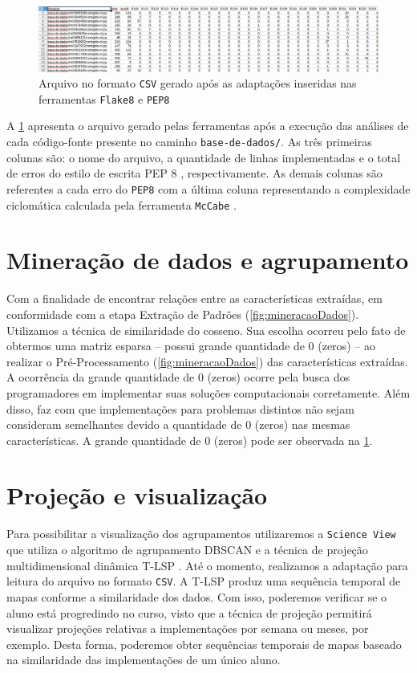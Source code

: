 		\begin{figure}[h]
			\centering
			\includegraphics[width=1\linewidth]{imagem/arquivoCSV}
			\caption{Arquivo no formato \texttt{CSV} gerado após as adaptações inseridas nas ferramentas \texttt{Flake8} e \texttt{PEP8}}
			\label{fig:arquivoCSV}
		\end{figure}
		
		A \cref{fig:arquivoCSV} apresenta o arquivo gerado pelas ferramentas após a
		execução das análises de cada código-fonte presente no caminho \texttt{base-de-dados/}.
		As três primeiras colunas são: o nome do arquivo, a quantidade de linhas implementadas
		e o total de erros do estilo de escrita PEP 8 \cite{van2001pep}, respectivamente. As
		demais colunas são referentes a cada erro do \texttt{PEP8} \cite{pep8} com a última
		coluna representando a complexidade ciclomática calculada pela ferramenta
		\texttt{McCabe} \cite{mccabe}.

	\section{Mineração de dados e agrupamento}
		Com a finalidade de encontrar relações entre as características extraídas, em
		conformidade com a etapa Extração de Padrões (\cref{fig:mineracaoDados}).
		Utilizamos a técnica de similaridade do cosseno. Sua escolha ocorreu pelo fato de obtermos
		uma matriz esparsa -- possui grande quantidade de 0 (zeros) -- ao realizar o
		Pré-Processamento (\cref{fig:mineracaoDados}) das características extraídas. A
		ocorrência da grande quantidade de 0 (zeros) ocorre pela busca dos programadores
		em implementar suas soluções computacionais corretamente. Além disso, faz com que
		implementações para problemas distintos não sejam consideram semelhantes devido a
		quantidade de 0 (zeros) nas mesmas características. A grande quantidade de 0 (zeros)
		pode ser observada na \cref{fig:arquivoCSV}.
	
	\section{Projeção e visualização}
		Para possibilitar a visualização dos agrupamentos utilizaremos a \texttt{Science View}
		\cite{Alencar-etal:2012} que utiliza o algoritmo de agrupamento \acs{DBSCAN} \cite{Ester1996}
		e a técnica de projeção multidimensional dinâmica \ac{T-LSP} \cite{Alencar}. Até o momento,
		realizamos a adaptação para leitura do arquivo no formato \texttt{CSV}. A \acs{T-LSP} \cite{Alencar}
		produz uma sequência temporal de mapas conforme a similaridade dos dados. Com isso, poderemos
		verificar se o aluno está progredindo no curso, visto que a técnica de projeção permitirá
		visualizar projeções relativas a implementações por semana ou meses, por exemplo. Desta
		forma, poderemos obter sequências temporais de mapas baseado na similaridade das
		implementações de um único aluno.
		
